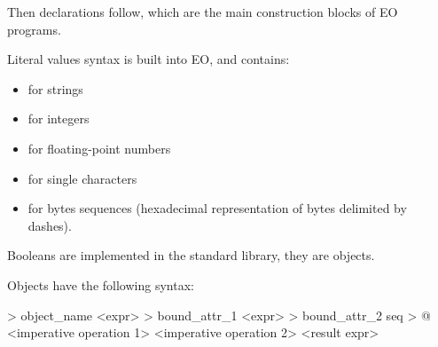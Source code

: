 Then declarations follow, which are the main construction blocks of EO programs.

Literal values syntax is built into EO, and contains:
\begin{itemize}
    \item {} for strings
    \item {} for integers
    \item {} for floating-point numbers
    \item {} for single characters
    \item {} for bytes sequences (hexadecimal representation of bytes delimited by dashes).
\end{itemize}

Booleans are implemented in the standard library, they are objects.

Objects have the following syntax:

\begin{ffcode}
 > object_name
    <expr> > bound_attr_1
    <expr> > bound_attr_2
    seq > @
        <imperative operation 1>
        <imperative operation 2>
        <result expr>
\end{ffcode}

